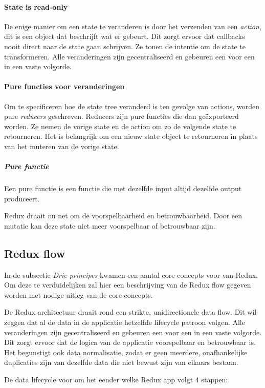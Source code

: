 \paragraph{State is read-only}
De enige manier om een state te veranderen is door het verzenden van een \textit{action}, dit is een object dat beschrijft wat er gebeurt. Dit zorgt ervoor dat callbacks nooit direct naar de state gaan schrijven. Ze tonen de intentie om de state te transformeren. Alle veranderingen zijn gecentraliseerd en gebeuren een voor een in een vaste volgorde.   

\paragraph{Pure functies voor veranderingen}
Om te specificeren hoe de state tree veranderd is ten gevolge van actions, worden pure \textit{reducers} geschreven. Reducers zijn pure functies die dan geëxporteerd worden. Ze nemen de vorige state en de action om zo de volgende state te retourneren. Het is belangrijk om een nieuw state object te retourneren in plaats van het muteren van de vorige state. 

\subparagraph{Pure functie}
Een pure functie is een functie die met dezelfde input altijd dezelfde output produceert.
\autocite{Pure01}

Redux draait nu net om de voorspelbaarheid en betrouwbaarheid. Door een mutatie kan deze state niet meer voorspelbaar of betrouwbaar zijn. 

\subsection{Redux flow}
In de subsectie \textit{Drie principes} kwamen een aantal core concepts voor van Redux. Om deze te verduidelijken zal hier een beschrijving van de Redux flow gegeven worden met nodige uitleg van de core concepts. 

De Redux architectuur draait rond een strikte, unidirectionele data flow. Dit wil zeggen dat al de data in de applicatie hetzelfde lifecycle patroon volgen. Alle veranderingen zijn gecentraliseerd en gebeuren een voor een in een vaste volgorde. Dit zorgt ervoor dat de logica van de applicatie voorspelbaar en betrouwbaar is. Het begunstigt ook data normalisatie, zodat er geen meerdere, onafhankelijke duplicaties zijn van dezelfde data die niet bewust zijn van elkaars bestaan. 

De data lifecycle voor om het eender welke Redux app volgt 4 stappen:

